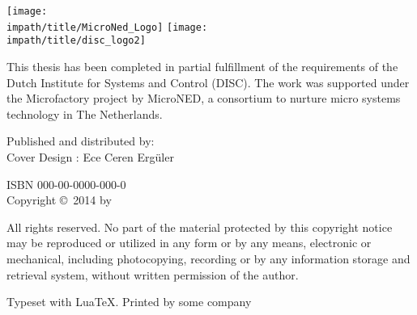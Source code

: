 \vspace{20mm}
\begin{center}
    \Large\ilhana
\end{center}
\newpage
\thispagestyle{empty}
\smallskip\noindent
{
\flushleft\texttt{[image: \\impath/title/MicroNed\_Logo]}\hspace*{0.75cm}
\vspace{1em}
\texttt{[image: \\impath/title/disc\_logo2]}
\vspace{1em}


\parbox{\textwidth}{\noindent This thesis has been completed in partial fulfillment of
the requirements of the Dutch Institute for Systems and Control
(DISC). The work was supported under the Microfactory project by
MicroNED, a consortium to nurture micro systems technology in
The Netherlands.
}
\vfill

Published and distributed by: \ilhana\\
Cover Design : Ece Ceren Erg\"{u}ler

\bigskip{}
ISBN 000-00-0000-000-0\\
Copyright \copyright~2014 by \ilhana
}


\bigskip{}
\noindent All rights reserved. No part of the material protected by
this copyright notice may be reproduced or utilized in any form or
by any means, electronic or mechanical, including photocopying,
recording or by any information storage and retrieval system,
without written permission of the author.

\bigskip{}
\noindent Typeset with Lua\kern-0.9bp\TeX. Printed by some company
